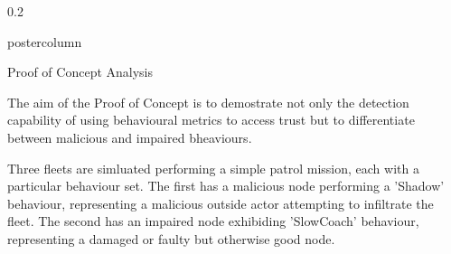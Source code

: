\documentclass[final,hyperref={pdfpagelabels=false}]{beamer}
\def\colwidth{0.2\linewidth}
\begin{document}
\begin{frame}[fragile]
\begin{columns}[T]
\begin{column}{\colwidth}
\begin{beamercolorbox}[center,wd=\textwidth]{postercolumn}
\begin{minipage}[T]{.98\textwidth}
{%
          \begin{block}{Proof of Concept Analysis}
            
            The aim of the Proof of Concept is to demostrate not only the detection capability of using behavioural metrics to access trust but to differentiate between malicious and impaired bheaviours.

            \vspace{0.3\baselineskip}

            Three fleets are simluated performing a simple patrol mission, each with a particular behaviour set. The first has a malicious node performing a 'Shadow' behaviour, representing a malicious outside actor attempting to infiltrate the fleet. The second has an impaired node exhibiding 'SlowCoach' behaviour, representing a damaged or faulty but otherwise good node. 

            \vspace{0.3\baselineskip}
            

\end{block}}
\end{minipage}
\end{beamercolorbox}
\end{column}
\end{columns}
\end{frame}
\end{document}
